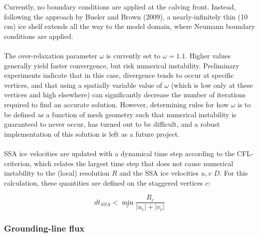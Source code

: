 \documentclass{article}
\begin{document}
Currently, no boundary conditions are applied at the calving front. Instead, following the approach by Bueler and Brown (2009), a nearly-infinitely thin (10 cm) ice shelf extends all the way to the model domain, where Neumann boundary conditions are applied. \\
\\
The over-relaxation parameter $\omega$ is currently set to $\omega = 1.1$. Higher values generally yield faster convergence, but risk numerical instability. Preliminary experiments indicate that in this case, divergence tends to occur at specific vertices, and that using a spatially variable value of $\omega$ (which is low only at these vertices and high elsewhere) can significantly decrease the number of iterations required to find an accurate solution. However, determining rules for how $\omega$ is to be defined as a function of mesh geometry such that numerical instability is guaranteed to never occur, has turned out to be difficult, and a robust implementation of this solution is left as a future project.\\
\\
SSA ice velocities are updated with a dynamical time step according to the CFL-criterion, which relates the largest time step that does not cause numerical instability to the (local) resolution $R$ and the SSA ice velocities $u,v$ $D$. For this calculation, these quantities are defined on the staggered vertices $c$:

\begin{equation} \label{eq:SSA_dt}
dt_{SSA} < \min_c \frac{R_c}{|u_c| + |v_c|}
\end{equation}

\subsubsection{Grounding-line flux}
\end{document}
